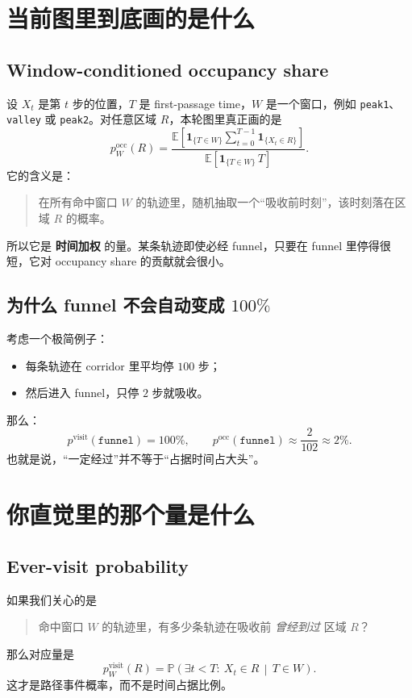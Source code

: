 \documentclass[11pt,fontset=fandol]{ctexart}
\begin{document}
\section{当前图里到底画的是什么}
\subsection{Window-conditioned occupancy share}
设 $X_t$ 是第 $t$ 步的位置，$T$ 是 first-passage time，$W$ 是一个窗口，例如 \texttt{peak1}、\texttt{valley} 或 \texttt{peak2}。对任意区域 $R$，本轮图里真正画的是
\[
p^{\mathrm{occ}}_W(R)
=
\frac{
\mathbb{E}\!\left[
\mathbf{1}_{\{T\in W\}}
\sum_{t=0}^{T-1}\mathbf{1}_{\{X_t\in R\}}
\right]
}{
\mathbb{E}\!\left[
\mathbf{1}_{\{T\in W\}}\,T
\right]
}.
\]
它的含义是：
\begin{quote}
在所有命中窗口 $W$ 的轨迹里，随机抽取一个“吸收前时刻”，该时刻落在区域 $R$ 的概率。
\end{quote}

所以它是 \textbf{时间加权} 的量。某条轨迹即使必经 funnel，只要在 funnel 里停得很短，它对 occupancy share 的贡献就会很小。

\subsection{为什么 funnel 不会自动变成 $100\%$}
考虑一个极简例子：
\begin{itemize}
  \item 每条轨迹在 corridor 里平均停 $100$ 步；
  \item 然后进入 funnel，只停 $2$ 步就吸收。
\end{itemize}
那么：
\[
p^{\mathrm{visit}}(\texttt{funnel}) = 100\%,
\qquad
p^{\mathrm{occ}}(\texttt{funnel}) \approx \frac{2}{102}\approx 2\%.
\]
也就是说，“一定经过”并不等于“占据时间占大头”。

\section{你直觉里的那个量是什么}
\subsection{Ever-visit probability}
如果我们关心的是
\begin{quote}
命中窗口 $W$ 的轨迹里，有多少条轨迹在吸收前 \emph{曾经到过} 区域 $R$？
\end{quote}
那么对应量是
\[
p^{\mathrm{visit}}_W(R)
=
\mathbb{P}\!\left(\exists t<T:\ X_t\in R \,\middle|\, T\in W\right).
\]
这才是路径事件概率，而不是时间占据比例。
\end{document}
